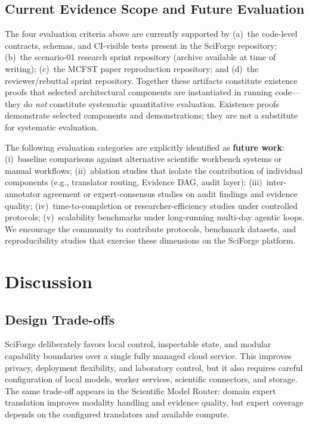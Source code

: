 \documentclass[sn-basic,Numbered,pdflatex]{sn-jnl}
\begin{document}
\subsection{Current Evidence Scope and Future Evaluation}

The four evaluation criteria above are currently supported by (a)~the code-level contracts, schemas, and CI-visible tests present in the SciForge repository; (b)~the scenario-01 research sprint repository (archive available at time of writing); (c)~the MCFST paper reproduction repository; and (d)~the reviewer/rebuttal sprint repository. Together these artifacts constitute existence proofs that selected architectural components are instantiated in running code---they do \emph{not} constitute systematic quantitative evaluation. Existence proofs demonstrate selected components and demonstrations; they are not a substitute for systematic evaluation.

The following evaluation categories are explicitly identified as \textbf{future work}: (i)~baseline comparisons against alternative scientific workbench systems or manual workflows; (ii)~ablation studies that isolate the contribution of individual components (e.g., translator routing, Evidence DAG, audit layer); (iii)~inter-annotator agreement or expert-consensus studies on audit findings and evidence quality; (iv)~time-to-completion or researcher-efficiency studies under controlled protocols; (v)~scalability benchmarks under long-running multi-day agentic loops. We encourage the community to contribute protocols, benchmark datasets, and reproducibility studies that exercise these dimensions on the SciForge platform.


\section{Discussion}

\subsection{Design Trade-offs}

SciForge deliberately favors local control, inspectable state, and modular capability boundaries over a single fully managed cloud service. This improves privacy, deployment flexibility, and laboratory control, but it also requires careful configuration of local models, worker services, scientific connectors, and storage. The same trade-off appears in the Scientific Model Router: domain expert translation improves modality handling and evidence quality, but expert coverage depends on the configured translators and available compute.
\end{document}

